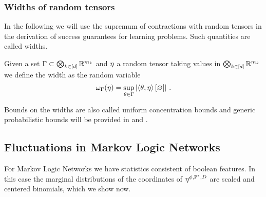 \subsubsection{Widths of random tensors}

In the following we will use the supremum of contractions with random tensors in the derivation of success guarantees for learning problems.
Such quantities are called widths.

\begin{definition}
	Given a set $\Gamma\subset\bigotimes_{k\in[d]} \mathbb{R}^{m_{k}}$ and $\eta$ a random tensor taking values in $\bigotimes_{k\in[d]} \mathbb{R}^{m_{k}}$ we define the width as the random variable
		\[ \omega_{\Gamma}(\eta) = \sup_{\theta\in\Gamma} \left|\left\langle \theta,\eta\right\rangle \left[ \varnothing \right]\right| \, . \]	
\end{definition}


Bounds on the widths are also called uniform concentration bounds \cite{goessman_uniform_2021} and generic probabilistic bounds will be provided in  and  .





\subsection{Fluctuations in Markov Logic Networks}


For Markov Logic Networks we have statistics consistent of boolean features.
In this case the marginal distributions of the coordinates of $\eta^{\phi,\mathbb{P}^*,D}$ are scaled and centered binomials, which we show now.

